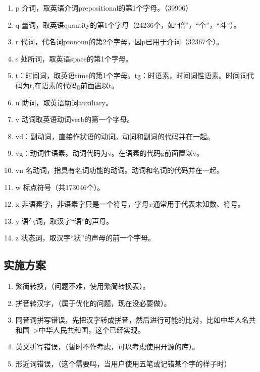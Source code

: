 \begin{enumerate}[(1)]
\item p 介词，取英语介词prepositional的第1个字母。（39906）
\item q 量词，取英语quantity的第1个字母（24236个，如“倍”，“个”，“斗”）。
\item r 代词，代名词pronoun的第2个字母，因p已用于介词（32367个）。
\item s 处所词，取英语space的第1个字母。
\item t：时间词，取英语time的第1个字母。tg：时语素，时间词性语素。时间词代码为t,在语素的代码g前面置以t。
\item u 助词，取英语助词auxiliary。
\item v 动词取英语动词verb的第一个字母。
\item vd：副动词，直接作状语的动词。动词和副词的代码并在一起。
\item vg：动词性语素。动词代码为v。在语素的代码g前面置以v。
\item vn 名动词，指具有名词功能的动词。动词和名词的代码并在一起。
\item w 标点符号（共173046个）。
\item x 非语素字，非语素字只是一个符号，字母$x$通常用于代表未知数、符号。
\item y 语气词，取汉字“语”的声母。
\item z 状态词，取汉字“状”的声母的前一个字母。
\end{enumerate}
\subsection{实施方案}
\begin{enumerate}[(1)]
\item 繁简转换，（问题不难，使用繁简转换表）。
\item 拼音转汉字，（属于优化的问题，现在没必要做）。
\item 同音词拼写错误，先把汉字转成拼音，然后进行可能的比对，比如中华人名共和国-->中华人民共和国，这个已经实现。
\item 英文拼写错误，（暂时不作考虑，可以考虑使用开源的库）。
\item 形近词错误，（这个需要吗，当用户使用五笔或记错某个字的样子时）
\end{enumerate}
